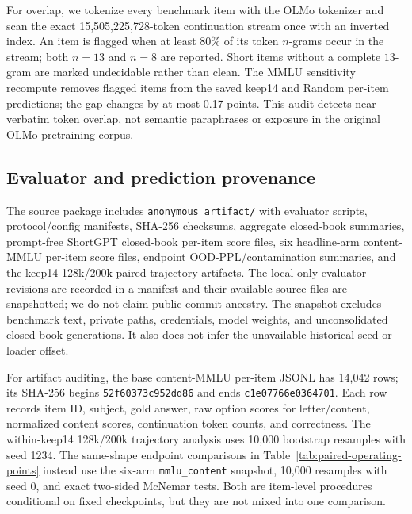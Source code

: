 For overlap, we tokenize every benchmark item with the OLMo tokenizer and scan
the exact 15,505,225,728-token continuation stream once with an inverted
index. An item is flagged when at least 80\% of its token $n$-grams occur in
the stream; both $n=13$ and $n=8$ are reported. Short items without a complete
$13$-gram are marked undecidable rather than clean. The MMLU sensitivity
recompute removes flagged items from the saved keep14 and Random per-item
predictions; the gap changes by at most 0.17 points. This audit detects
near-verbatim token overlap, not semantic paraphrases or exposure in the
original OLMo pretraining corpus.

\subsection{Evaluator and prediction provenance}
The source package includes \texttt{anonymous\_artifact/} with evaluator
scripts, protocol/config manifests, SHA-256 checksums, aggregate closed-book
summaries, prompt-free ShortGPT closed-book per-item score files, six
headline-arm content-MMLU per-item score files, endpoint OOD-PPL/contamination
summaries, and the keep14 128k/200k paired trajectory artifacts. The local-only
evaluator revisions are
recorded in a manifest and their available source files are snapshotted; we do
not claim public commit ancestry. The snapshot excludes benchmark text, private
paths, credentials, model weights, and unconsolidated closed-book generations.
It also does not infer the unavailable historical seed or loader offset.

For artifact auditing, the base content-MMLU per-item JSONL has 14,042 rows;
its SHA-256 begins \texttt{52f60373c952dd86} and ends
\texttt{c1e07766e0364701}. Each row records
item ID, subject, gold answer, raw option scores for letter/content, normalized
content scores, continuation token counts, and correctness. The within-keep14
128k/200k trajectory analysis uses 10,000 bootstrap resamples with seed 1234.
The same-shape endpoint comparisons in
Table~\ref{tab:paired-operating-points} instead use the six-arm
\texttt{mmlu\_content} snapshot, 10,000 resamples with seed 0, and exact
two-sided McNemar tests. Both are item-level procedures conditional on fixed
checkpoints, but they are not mixed into one comparison.


